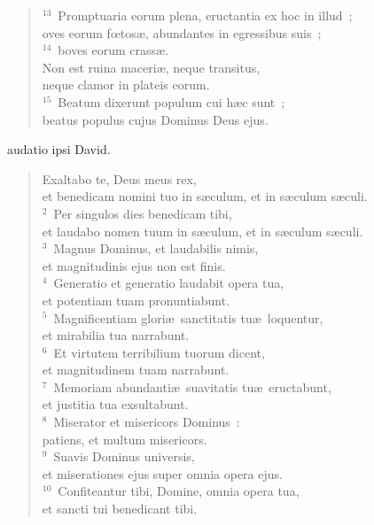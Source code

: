 \begin{flushleft}
\begin{verse}
${}^{13}$~Promptuaria eorum plena, eructantia ex hoc in illud~;\\ oves eorum fœtos\ae , abundantes in egressibus suis~;\\
${}^{14}$~boves eorum crass\ae .\\ Non est ruina maceri\ae , neque transitus,\\ neque clamor in plateis eorum.\\
${}^{15}$~Beatum dixerunt populum cui h\ae c sunt~;\\ beatus populus cujus Dominus Deus ejus.\end{verse}\end{flushleft}



\bchapter
{}audatio ipsi David. \begin{flushleft}\begin{verse}\vspace{6pt}Exaltabo te, Deus meus rex,\\ et benedicam nomini tuo in s\ae culum, et in s\ae culum s\ae culi.\\
${}^{2}$~Per singulos dies benedicam tibi,\\ et laudabo nomen tuum in s\ae culum, et in s\ae culum s\ae culi.\\
${}^{3}$~Magnus Dominus, et laudabilis nimis,\\ et magnitudinis ejus non est finis.\\
${}^{4}$~Generatio et generatio laudabit opera tua,\\ et potentiam tuam pronuntiabunt.\\
${}^{5}$~Magnificentiam glori\ae\ sanctitatis tu\ae\ loquentur,\\ et mirabilia tua narrabunt.\\
${}^{6}$~Et virtutem terribilium tuorum dicent,\\ et magnitudinem tuam narrabunt.\\
${}^{7}$~Memoriam abundanti\ae\ suavitatis tu\ae\ eructabunt,\\ et justitia tua exsultabunt.\\
${}^{8}$~Miserator et misericors Dominus~:\\ patiens, et multum misericors.\\
${}^{9}$~Suavis Dominus universis,\\ et miserationes ejus super omnia opera ejus.\\
${}^{10}$~Confiteantur tibi, Domine, omnia opera tua,\\ et sancti tui benedicant tibi.\\

\end{verse}
\end{flushleft}
